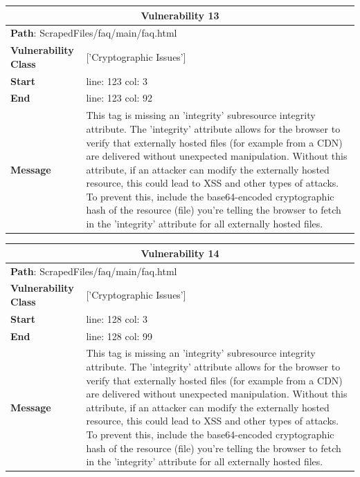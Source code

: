 \documentclass[12pt]{article}
\begin{document}
\vspace{0.7cm}
\FloatBarrier
\begin{table}[!h]
\centering
\renewcommand{\arraystretch}{1.3}
\begin{tabular}{|l|p{10cm}|}
\hline
\multicolumn{2}{|c|}{\textbf{Vulnerability 13}} \\
\hline
\multicolumn{2}{|l|}{\textbf{Path}: ScrapedFiles/faq/main/faq.html} \\
\hline
\textbf{Vulnerability Class} & ['Cryptographic Issues'] \\
\hline
\textbf{Start} & line: 123 \quad col: 3 \\
\hline
\textbf{End} & line: 123 \quad col: 92 \\
\hline
\textbf{Message} & This tag is missing an 'integrity' subresource integrity attribute. The 'integrity' attribute allows for the browser to verify that externally hosted files (for example from a CDN) are delivered without unexpected manipulation. Without this attribute, if an attacker can modify the externally hosted resource, this could lead to XSS and other types of attacks. To prevent this, include the base64-encoded cryptographic hash of the resource (file) you're telling the browser to fetch in the 'integrity' attribute for all externally hosted files. \\
\hline
\end{tabular}
\end{table}
\vspace{0.7cm}
\FloatBarrier
\begin{table}[!h]
\centering
\renewcommand{\arraystretch}{1.3}
\begin{tabular}{|l|p{10cm}|}
\hline
\multicolumn{2}{|c|}{\textbf{Vulnerability 14}} \\
\hline
\multicolumn{2}{|l|}{\textbf{Path}: ScrapedFiles/faq/main/faq.html} \\
\hline
\textbf{Vulnerability Class} & ['Cryptographic Issues'] \\
\hline
\textbf{Start} & line: 128 \quad col: 3 \\
\hline
\textbf{End} & line: 128 \quad col: 99 \\
\hline
\textbf{Message} & This tag is missing an 'integrity' subresource integrity attribute. The 'integrity' attribute allows for the browser to verify that externally hosted files (for example from a CDN) are delivered without unexpected manipulation. Without this attribute, if an attacker can modify the externally hosted resource, this could lead to XSS and other types of attacks. To prevent this, include the base64-encoded cryptographic hash of the resource (file) you're telling the browser to fetch in the 'integrity' attribute for all externally hosted files. \\
\hline
\end{tabular}
\end{table}
\end{document}
